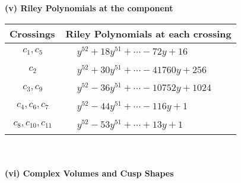 \documentclass[1p]{elsarticle_modified}
\theoremstyle{definition}
\begin{document}
\newpage\renewcommand{\arraystretch}{1}
\flushleft \textbf{(v) Riley Polynomials at the component}\newline \\
\begin{tabular}{m{50pt}|m{274pt}}
Crossings & \hspace{64pt}Riley Polynomials at each crossing \\
\hline $$\begin{aligned}c_{1},c_{5}\end{aligned}$$&$\begin{aligned}
&y^{52}+18 y^{51}+\cdots-72 y+16
\end{aligned}$\\
\hline $$\begin{aligned}c_{2}\end{aligned}$$&$\begin{aligned}
&y^{52}+30 y^{51}+\cdots-41760 y+256
\end{aligned}$\\
\hline $$\begin{aligned}c_{3},c_{9}\end{aligned}$$&$\begin{aligned}
&y^{52}-36 y^{51}+\cdots-10752 y+1024
\end{aligned}$\\
\hline $$\begin{aligned}c_{4},c_{6},c_{7}\end{aligned}$$&$\begin{aligned}
&y^{52}-44 y^{51}+\cdots-116 y+1
\end{aligned}$\\
\hline $$\begin{aligned}c_{8},c_{10},c_{11}\end{aligned}$$&$\begin{aligned}
&y^{52}-53 y^{51}+\cdots+13 y+1
\end{aligned}$\\
\hline
\end{tabular}\\~\\
\newpage\flushleft \textbf{(vi) Complex Volumes and Cusp Shapes}
\end{document}
